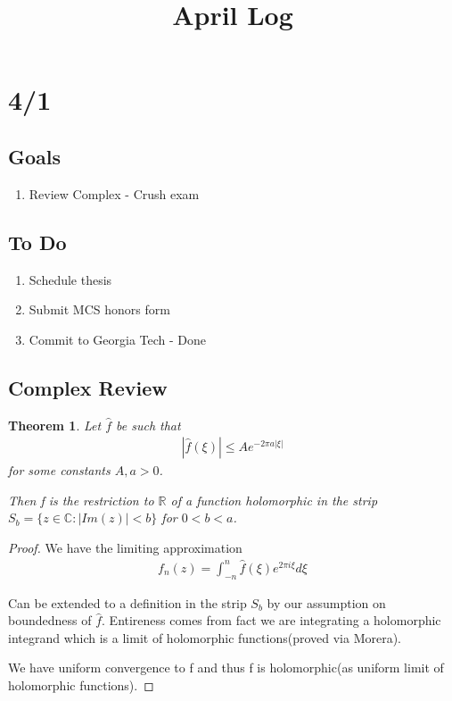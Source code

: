 \documentclass[11pt]{article}
\title{April Log}
\newcommand{\R}{\mathbb{R}}
\newcommand{\C}{\mathbb{C}}
\newtheorem{theorem}{Theorem}
\theoremstyle{remark}
\begin{document}
\maketitle

\section{4/1}

\subsection{Goals}

\begin{enumerate}
	\item Review Complex - Crush exam
\end{enumerate}

\subsection{To Do}

\begin{enumerate}
	\item Schedule thesis 
	\item Submit MCS honors form
	\item Commit to Georgia Tech - Done
\end{enumerate}


\subsection{Complex Review}

\begin{theorem}
	Let $\hat{f}$ be such that 
	\begin{align*}
		|\hat{f}(\xi)| \leq Ae^{-2\pi a |\xi|}
	\end{align*}
	for some constants $A,a > 0$. 

	Then f is the restriction to $\R$ of a function holomorphic in the strip $S_b = \{z \in \C : |Im(z)| < b\}$ for $0 < b < a$. 
\end{theorem}

\begin{proof}
	We have the limiting approximation
	\begin{align*}
		f_n(z) = \int_{-n}^n \hat{f}(\xi)e^{2\pi i \xi}d\xi
	\end{align*}

	Can be extended to a definition in the strip $S_b$ by our assumption on boundedness of $\hat{f}$. Entireness comes from fact we are integrating a holomorphic integrand which is a limit of holomorphic functions(proved via Morera).

	We have uniform convergence to f and thus f is holomorphic(as uniform limit of holomorphic functions).
\end{proof}
\end{document}
